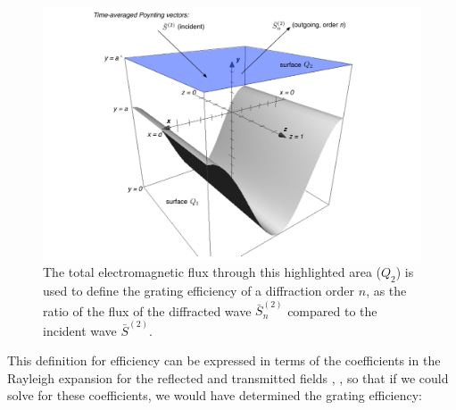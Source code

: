 \begin{figure}[htb] %
   \centering
   \includegraphics[scale=0.5]{../data/Chapter2/2c_poynting/2c.pdf} 
   \caption{The total electromagnetic flux through this highlighted area ($Q_2$) is used to define the grating efficiency of a diffraction order $n$, as the ratio of the flux of the diffracted wave $\bar S_n^{(2)}$ compared to the incident wave $\bar S^{(2)}$.}
   \label{2c}
\end{figure}

This definition for efficiency can be expressed in terms of the coefficients in the Rayleigh expansion for the reflected and transmitted fields , , so that if we could solve for these coefficients, we would have determined the grating efficiency:
